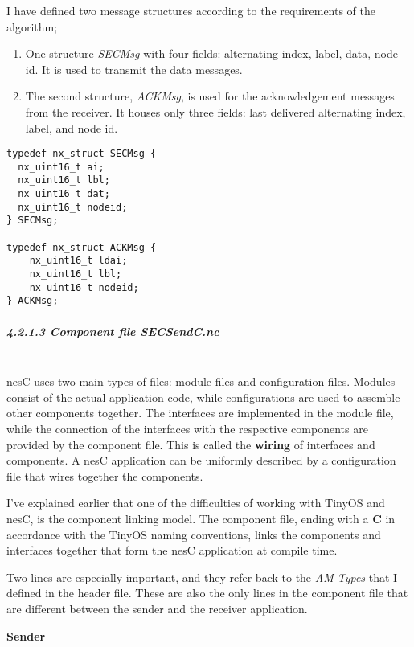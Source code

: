 I have defined two message structures according to the requirements of
the algorithm;

\begin{enumerate}
\def\labelenumi{\arabic{enumi}.}
\itemsep1pt\parskip0pt
\item
  One structure \emph{SECMsg} with four fields: alternating index,
  label, data, node id. It is used to transmit the data messages.
\item
  The second structure, \emph{ACKMsg}, is used for the acknowledgement
  messages from the receiver. It houses only three fields: last
  delivered alternating index, label, and node id.
\end{enumerate}

\begin{verbatim}
typedef nx_struct SECMsg {
  nx_uint16_t ai;
  nx_uint16_t lbl;
  nx_uint16_t dat;
  nx_uint16_t nodeid;
} SECMsg;

typedef nx_struct ACKMsg {
    nx_uint16_t ldai;
    nx_uint16_t lbl;
    nx_uint16_t nodeid;
} ACKMsg;
\end{verbatim}

\subparagraph{4.2.1.3 Component file
\emph{SECSendC.nc}\\\\}\label{component-file-secsendc.nc}

nesC uses two main types of files: module files and configuration files.
Modules consist of the actual application code, while configurations are
used to assemble other components together. The interfaces are
implemented in the module file, while the connection of the interfaces
with the respective components are provided by the component file. This
is called the \textbf{wiring} of interfaces and components. A nesC
application can be uniformly described by a configuration file that
wires together the components\cite{gay2003nesc}.

I've explained earlier that one of the difficulties of working with
TinyOS and nesC, is the component linking model. The component file,
ending with a \textbf{C} in accordance with the TinyOS naming
conventions, links the components and interfaces together that form the
nesC application at compile time.

Two lines are especially important, and they refer back to the \emph{AM
Types} that I defined in the header file. These are also the only lines
in the component file that are different between the sender and the
receiver application.

\textbf{Sender}

